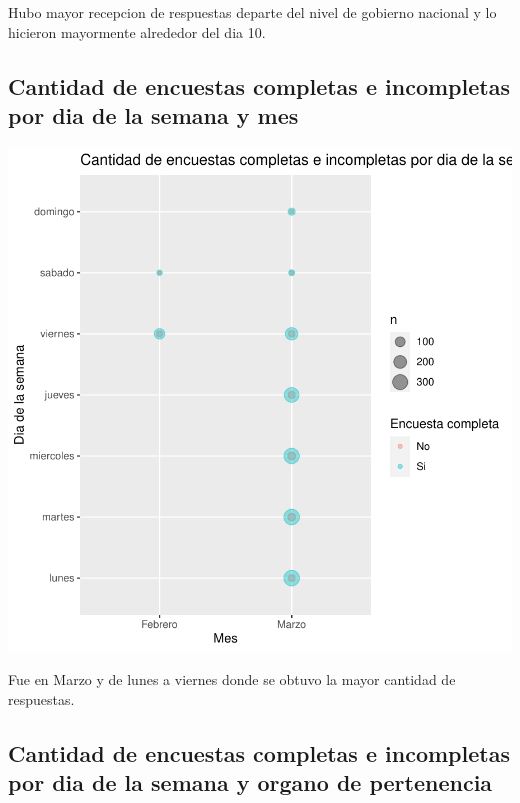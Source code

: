 \documentclass{article}
\begin{document}
Hubo mayor recepcion de respuestas departe del nivel de gobierno nacional y lo hicieron mayormente alrededor del dia 10.

\subsection{Cantidad de encuestas completas e incompletas por dia de la semana y mes}

\includegraphics{seguimientov3-051}

Fue en Marzo y de lunes a viernes donde se obtuvo la mayor cantidad de respuestas.

\subsection{Cantidad de encuestas completas e incompletas por dia de la semana y organo de pertenencia}
\end{document}
